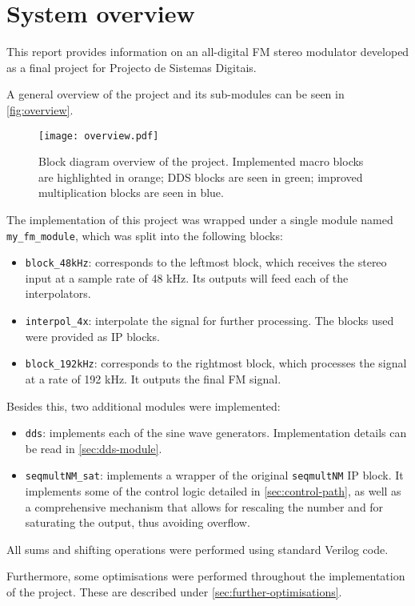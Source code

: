 \section{System overview}

This report provides information on an all-digital FM stereo modulator developed as a final project for Projecto de Sistemas Digitais. 

A general overview of the project and its sub-modules can be seen in \autoref{fig:overview}.

\begin{figure}[!h]
\centering
\texttt{[image: overview.pdf]}
\caption{Block diagram overview of the project. Implemented macro blocks are highlighted in orange; DDS blocks are seen in green; improved multiplication blocks are seen in blue.}\label{fig:overview}
\end{figure}

The implementation of this project was wrapped under a single module named \texttt{my\_fm\_module}, which was split into the following blocks:

\begin{itemize}
	\item \texttt{block\_48kHz}: corresponds to the leftmost block, which receives the stereo input at a sample rate of 48 kHz. Its outputs will feed each of the interpolators.
	\item \texttt{interpol\_4x}: interpolate the signal for further processing. The blocks used were provided as IP blocks.
	\item \texttt{block\_192kHz}: corresponds to the rightmost block, which processes the signal at a rate of 192 kHz. It outputs the final FM signal.
\end{itemize}

Besides this, two additional modules were implemented:
\begin{itemize}
	\item \texttt{dds}: implements each of the sine wave generators. Implementation details can be read in \autoref{sec:dds-module}.
	\item \texttt{seqmultNM\_sat}: implements a wrapper of the original \texttt{seqmultNM} IP block. It implements some of the control logic detailed in \autoref{sec:control-path}, as well as a comprehensive mechanism that allows for rescaling the number and for saturating the output, thus avoiding overflow.
\end{itemize}

All sums and shifting operations were performed using standard Verilog code.

Furthermore, some optimisations were performed throughout the implementation of the project. These are described under \autoref{sec:further-optimisations}.
